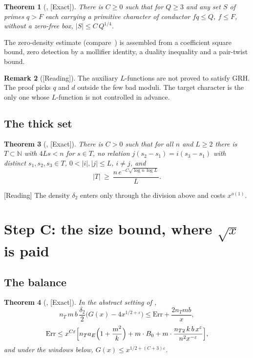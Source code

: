 \documentclass[11pt]{article}
\newcommand{\Exact}{\textcolor{exactc}{\textsf{\small[Exact]}}}
\newcommand{\Reading}{\textcolor{readc}{\textsf{\small[Reading]}}}
\newcommand{\eps}{\varepsilon}
\newcommand{\N}{\mathbb{N}}
\newcommand{\Err}{\mathrm{Err}}
\theoremstyle{plain}
\newtheorem{theorem}{Theorem}[section]
\theoremstyle{definition}
\newtheorem{remark}[theorem]{Remark}
\begin{document}
\begin{theorem}[, \Exact]
There is $C\ge 0$ such that for $Q\ge 3$ and any set $S$ of primes $q>F$ each carrying a primitive
character of conductor $fq\le Q$, $f\le F$, without a zero-free box,
$|S|\le C\,Q^{1/4}$.
\end{theorem}

The zero-density estimate  (compare~\cite[Ch.~10]{iwaniec-kowalski}) is assembled from a coefficient square bound, zero
detection by a mollifier identity, a duality inequality and a pair-twist bound.

\begin{remark}[\Reading]
The auxiliary $L$-functions are not proved to satisfy GRH. The proof picks $q$ and $d$ outside the
few bad moduli. The target character is the only one whose $L$-function is not controlled in
advance.
\end{remark}

\subsection{The thick set}

\begin{theorem}[, \Exact]
There is $C>0$ such that for all $n$ and $L\ge 2$ there is $T\subset\N$ with $4Ls<n$ for $s\in T$,
no relation $j(s_2-s_1)=i(s_3-s_1)$ with distinct $s_1,s_2,s_3\in T$, $0<|i|,|j|\le L$, $i\neq j$,
and
\[
|T|\ \ge\ \frac{n\,e^{-C\sqrt{\log n\,\log L}}}{L}.
\]
\end{theorem}

\Reading{} The density $\delta_2$ enters only through the division above and costs $x^{o(1)}$.

\section{Step C: the size bound, where $\sqrt{x}$ is paid}\label{sec:C}

\subsection{The balance}

\begin{theorem}[, \Exact]\label{thm:size}
In the abstract setting of ,
\[
n_T\,m\,b\,\frac{\delta_2}{2}\bigl(G(x)-4x^{1/2+\eps}\bigr)\le \Err + \frac{2n_T m b}{x},
\]
\[
\Err \le x^{C\eps}\Bigl[n_T a_E\Bigl(1+\frac{m^2}{k}\Bigr) + m\cdot B_0 + m\cdot\frac{n_{T2}\,k\,b\,x^{\eps}}{n^2x^{-\eps}}\Bigr],
\]
and under the windows below, $G(x)\le x^{1/2+(C+3)\eps}$.
\end{theorem}
\end{document}
